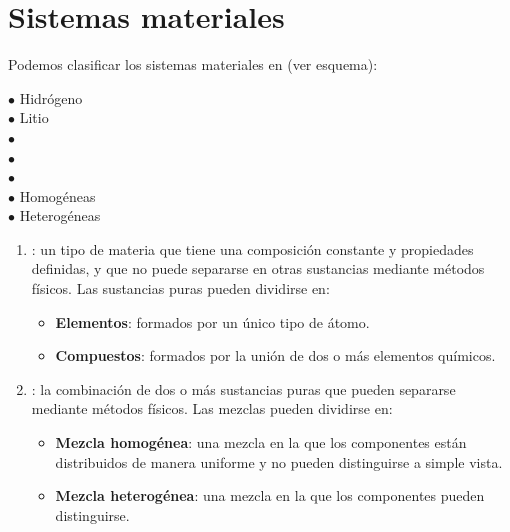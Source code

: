 

\section{Sistemas materiales}
Podemos clasificar los sistemas materiales en (ver esquema):
\vspace{12pt}

{
{
{\( \bullet \) Hidrógeno
\vspace{6pt}\\
    \( \bullet \) Litio}
\vspace{20pt}\\
{\( \bullet \)
\vspace{6pt}\\
    \( \bullet \)
\vspace{6pt}\\
    \( \bullet \)}
}
\vspace{20pt} \\
{\( \bullet \) Homogéneas
\vspace{6pt}\\
    \( \bullet \) Heterogéneas
}
}

\begin{enumerate}[label=\numberballmDarkTeal]
\item {}: un tipo de materia que tiene una composición constante y propiedades definidas, y que no puede separarse en otras sustancias mediante métodos físicos.
Las sustancias puras pueden dividirse en:
\begin{itemize}
    \item \textbf{Elementos}: formados por un único tipo de átomo.
    \item \textbf{Compuestos}: formados por la unión de dos o más elementos químicos.
\end{itemize}

\item {}: la combinación de dos o más sustancias puras que pueden separarse mediante métodos físicos.
Las mezclas pueden dividirse en:
\begin{itemize}
    \item \textbf{Mezcla homogénea}: una mezcla en la que los componentes están distribuidos de manera uniforme y no pueden distinguirse a simple vista.
    \item \textbf{Mezcla heterogénea}: una mezcla en la que los componentes pueden distinguirse.
\end{itemize}

\end{enumerate}


